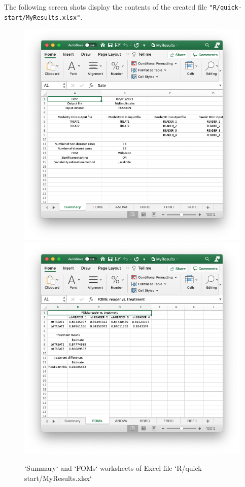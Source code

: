 \documentclass[
]{book}
\begin{document}
The following screen shots display the contents of the created file \texttt{"R/quick-start/MyResults.xlsx"}.

\begin{figure}

{\centering \includegraphics[width=0.5\linewidth,height=0.2\textheight]{R/quick-start/MyResultsSummary} \includegraphics[width=0.5\linewidth,height=0.2\textheight]{R/quick-start/MyResultsFOMs} 

}

\caption{`Summary` and `FOMs` worksheets of Excel file `R/quick-start/MyResults.xlsx`}\label{fig:quick-start-or-xlsx1}
\end{figure}
\end{document}

